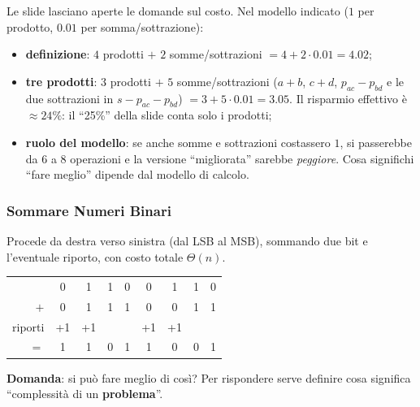 \documentclass[12pt, a4paper]{article}
\begin{document}
\begin{tcolorbox}[colback=lightergray!5, colframe=tocsubsec, title=\textbf{Nota mia (calcolo non riportato nelle slide)}]
Le slide lasciano aperte le domande sul costo. Nel modello indicato ($1$ per prodotto, $0.01$ per somma/sottrazione):
\begin{itemize}
    \item \textbf{definizione}: $4$ prodotti $+$ $2$ somme/sottrazioni $= 4+2\cdot0.01 = 4.02$;
    \item \textbf{tre prodotti}: $3$ prodotti $+$ $5$ somme/sottrazioni ($a+b$, $c+d$, $p_{ac}-p_{bd}$ e le due sottrazioni in $s-p_{ac}-p_{bd}$) $= 3+5\cdot0.01 = 3.05$. Il risparmio effettivo è $\approx 24\%$: il ``25\%'' della slide conta solo i prodotti;
    \item \textbf{ruolo del modello}: se anche somme e sottrazioni costassero $1$, si passerebbe da $6$ a $8$ operazioni e la versione ``migliorata'' sarebbe \textit{peggiore}. Cosa significhi ``fare meglio'' dipende dal modello di calcolo.
\end{itemize}
\end{tcolorbox}

\subsubsection{Sommare Numeri Binari}

\begin{tcolorbox}[colback=lightergray!10, colframe=tocsec, title=\textbf{Algoritmo Elementare della Somma}]
Procede da destra verso sinistra (dal LSB al MSB), sommando due bit e l'eventuale riporto, con costo totale $\Theta(n)$.
\end{tcolorbox}

\begin{center}
\begin{tabular}{r cccccccc}
 & 0 & 1 & 1 & 0 & 0 & 1 & 1 & 0 \\
$+$ & 0 & 1 & 1 & 1 & 0 & 0 & 1 & 1 \\
\textcolor{red!70!black}{riporti} & \textcolor{red!70!black}{+1} & \textcolor{red!70!black}{+1} & & & \textcolor{red!70!black}{+1} & \textcolor{red!70!black}{+1} & & \\
\midrule
$=$ & 1 & 1 & 0 & 1 & 1 & 0 & 0 & 1 \\
\end{tabular}
\end{center}

\textbf{Domanda}: si può fare meglio di così? Per rispondere serve definire cosa significa ``complessità di un \textbf{problema}''.
\end{document}
